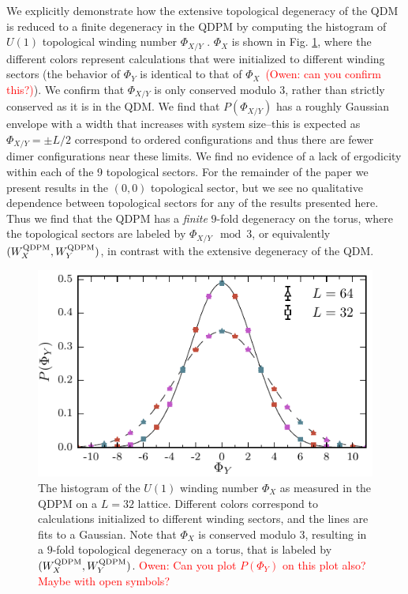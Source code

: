 \documentclass[twocolumn,prb,aps,floatfix,superscriptaddress]{revtex4-1}
\newcommand{\figref}[1]{Fig. \ref{#1}}
\newcommand{\note}[1]{\textcolor{red}{#1}}
\begin{document}
We explicitly demonstrate how the extensive topological degeneracy of the QDM is reduced to a finite degeneracy in the QDPM by computing the histogram of $U(1)$ topological winding number $\Phi_{X/Y}$ . $\Phi_X$ is shown in \figref{fig:u1_wind_qdpm}, where the different colors represent calculations that were initialized to different winding sectors (the behavior of $\Phi_Y$ is identical to that of $\Phi_X$~\note{(Owen: can you confirm this?)}). We confirm that $\Phi_{X/Y}$ is only conserved modulo $3$, rather than strictly conserved as it is in the QDM. We find that $P(\Phi_{X/Y})$ has a roughly Gaussian envelope with a width that increases with system size--this is expected as $\Phi_{X/Y} = \pm L/2$ correspond to ordered configurations and thus there are fewer dimer configurations near these limits. We find no evidence of a lack of ergodicity within each of the 9 topological sectors. For the remainder of the paper we present results in the $(0,0)$ topological sector, but we see no qualitative dependence between topological sectors for any of the results presented here.  Thus we find that the QDPM has a \emph{finite} $9$-fold degeneracy on the torus, where the topological sectors are labeled by $\Phi_{X/Y} \mod 3$, or equivalently $(W_X^{\rm{QDPM}},W_Y^{\rm{QDPM}})$, in contrast with the extensive degeneracy of the QDM.
\begin{figure}[]
    \centering
    \includegraphics[width=1.0\linewidth]{u1_wind_qdpm.pdf}
    \caption{The histogram of the $U(1)$ winding number $\Phi_X$ as measured in the QDPM on a
    $L=32$ lattice. Different colors correspond to calculations initialized to different winding sectors, and the lines are fits to a Gaussian. Note that $\Phi_X$ is conserved modulo $3$, resulting in a $9$-fold topological degeneracy on a torus, that is labeled by $(W_X^{\rm{QDPM}},W_Y^{\rm{QDPM}})$. \note{Owen: Can you plot $P\left(\Phi_Y\right)$ on this plot also? Maybe with open symbols?}}
    \label{fig:u1_wind_qdpm}
\end{figure}
\end{document}
